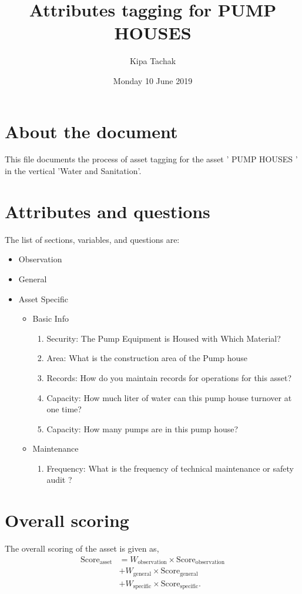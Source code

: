 \documentclass[oneside,twocolumn]{article}
\title{Attributes tagging for 
PUMP HOUSES 
}
\author{Kipa Tachak}
\date{Monday 10 June 2019}
\newcommand{\tsub}[2]{\text{#1}_{\text{#2}}}
\newcommand{\tsubb}[2]{#1_{\text{#2}}}
\begin{document}
\maketitle

\section{About the document}
This file documents the process of asset tagging for the asset '
PUMP HOUSES 
' in the
vertical 'Water and Sanitation'.

\section{Attributes and questions}
The list of sections, variables, and questions are:
    \begin{itemize}
    \item Observation
    \item General
    \item Asset Specific
    \begin{itemize}
\item Basic Info
\begin{enumerate}
\item Security: The Pump Equipment is Housed with Which Material?
\item Area: What is the construction area of the Pump house
\item Records: How do you maintain records for operations for this asset?
\item Capacity: How much liter of water can this pump house turnover at one time?
\item Capacity: How many pumps are in this pump house?
\end{enumerate}

\item Maintenance
\begin{enumerate}
\item Frequency: What is the frequency of technical maintenance or safety audit ?
\end{enumerate}

\end{itemize}

    \end{itemize}
\section{Overall scoring}
The overall scoring of the asset is given as,
\begin{align*}
	\tsub{Score}{asset} &= \tsubb{W}{observation} \times \tsub{Score}{observation} \\
	&+ \tsubb{W}{general} \times \tsub{Score}{general} \\
	&+ \tsubb{W}{specific} \times \tsub{Score}{specific}.
\end{align*}
\end{document}
